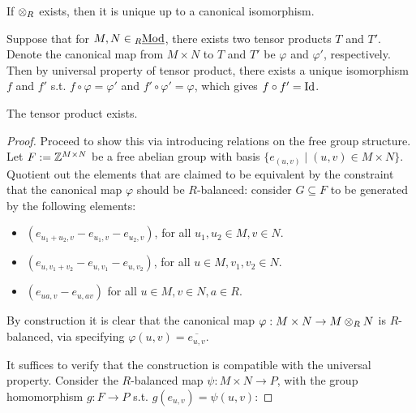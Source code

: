 \begin{remark}
    If $\otimes_R$ exists, then it is unique up to a canonical isomorphism. 
    
    Suppose that for $M, N \in {}_{R}\underline{\textup{Mod}}$, there exists two tensor products $T$ and $T'$. Denote the canonical map from $M \times N$ to $T$ and $T'$ be $\varphi$ and $\varphi'$, respectively. Then by universal property of tensor product, there exists a unique isomorphism $f$ and $f'$ s.t. $f \circ \varphi = \varphi'$ and $f' \circ \varphi' = \varphi$, which gives $f \circ f' = \mathrm{Id}$.
\end{remark}

\begin{proposition}
    The tensor product exists.
\end{proposition}

\begin{proof}
    Proceed to show this via introducing relations on the free group structure. Let $F := \mathbb{Z}^{M \times N}$ be a free abelian group with basis $\{ e_{(u, v)} \mid (u, v) \in M \times N \}$. Quotient out the elements that are claimed to be equivalent by the constraint that the canonical map $\varphi$ should be $R$-balanced: consider $G \subseteq F$ to be generated by the following elements:
    \begin{itemize}
        \item $(e_{u_1 + u_2, v} - e_{u_1, v} - e_{u_2, v})$, for all $u_1, u_2 \in M, v \in N$.
        \item $(e_{u, v_1 + v_2} - e_{u, v_1} - e_{u, v_2})$, for all $u \in M, v_1, v_2 \in N$.
        \item $(e_{ua, v} - e_{u, av})$ for all $u \in M, v \in N, a \in R$.
    \end{itemize}
    By construction it is clear that the canonical map $\varphi: M \times N \to M \otimes_R N$ is $R$-balanced, via specifying $\varphi(u, v) = \overline{e_{u, v}}$. 

    It suffices to verify that the construction is compatible with the universal property. Consider the $R$-balanced map $\psi: M \times N \to P$, with the group homomorphism $g: F \to P$ s.t. $g(e_{u, v}) = \psi(u, v)$:
    

\end{proof}
